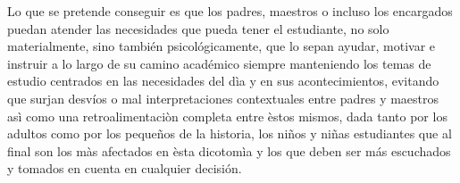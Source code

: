 Lo que se pretende conseguir es que los padres, maestros o incluso los encargados puedan
atender las necesidades que pueda tener el estudiante, no solo materialmente, sino también
psicológicamente, que lo sepan ayudar, motivar e instruir a lo largo de su camino académico
siempre manteniendo los temas de estudio centrados en las necesidades del dìa y en sus
acontecimientos, evitando que surjan desvíos o mal interpretaciones contextuales entre padres y
maestros asì como una retroalimentaciòn completa entre èstos mismos, dada tanto por los adultos
como por los pequeños de la historia, los niños y niñas estudiantes que al final son los màs
afectados en èsta dicotomìa y los que deben ser más escuchados y tomados en cuenta en
cualquier decisión.